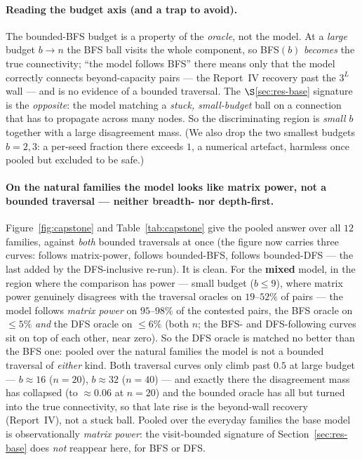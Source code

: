 \documentclass[11pt,a4paper]{article}
\begin{document}
\paragraph{Reading the budget axis (and a trap to avoid).} The bounded-BFS budget is a property of
the \emph{oracle}, not the model. At a \emph{large} budget $b\to n$ the BFS ball visits the whole
component, so BFS$(b)$ \emph{becomes} the true connectivity; ``the model follows BFS'' there means
only that the model correctly connects beyond-capacity pairs --- the Report~IV recovery past the
$3^L$ wall --- and is no evidence of a bounded traversal. The $\S$\ref{sec:res-base} signature is
the \emph{opposite}: the model matching a \emph{stuck, small-budget} ball on a connection that has
to propagate across many nodes. So the discriminating region is \emph{small} $b$ together with a
large disagreement mass. (We also drop the two smallest budgets $b=2,3$: a per-seed fraction there
exceeds $1$, a numerical artefact, harmless once pooled but excluded to be safe.)

\paragraph{On the natural families the model looks like matrix power, not a bounded traversal ---
neither breadth- nor depth-first.} Figure~\ref{fig:capstone} and Table~\ref{tab:capstone} give the
pooled answer over all $12$ families, against \emph{both} bounded traversals at once (the figure now
carries three curves: follows matrix-power, follows bounded-BFS, follows bounded-DFS --- the last
added by the DFS-inclusive re-run). It is clean. For the \textbf{mixed} model, in the region where
the comparison has power --- small budget ($b\le 9$), where matrix power genuinely disagrees with
the traversal oracles on $19$--$52\%$ of pairs --- the model follows \emph{matrix power} on
$95$--$98\%$ of the contested pairs, the BFS oracle on $\le 5\%$ \emph{and} the DFS oracle on
$\le 6\%$ (both $n$; the BFS- and DFS-following curves sit on top of each other, near zero). So the
DFS oracle is matched no better than the BFS one: pooled over the natural families the model is not a
bounded traversal of \emph{either} kind. Both traversal curves only climb past $0.5$ at large budget
--- $b\approx 16$ ($n=20$), $b\approx 32$ ($n=40$) --- and exactly there the disagreement mass has
collapsed (to $\approx 0.06$ at $n=20$) and the bounded oracle has all but turned into the true
connectivity, so that late rise is the beyond-wall recovery (Report~IV), not a stuck ball. Pooled
over the everyday families the base model is observationally \emph{matrix power}: the visit-bounded
signature of Section~\ref{sec:res-base} does \emph{not} reappear here, for BFS or DFS.
\end{document}
